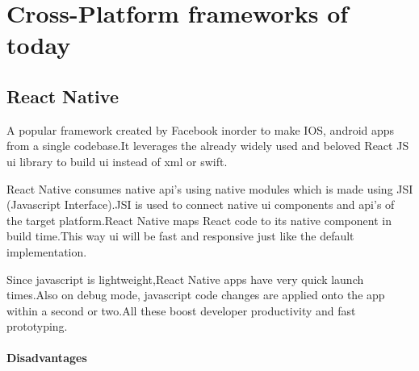 \documentclass[14pt]{extarticle}
\begin{document}
\newpage
\section{Cross-Platform frameworks of today}
\subsection{React Native}
\parbox{\linewidth}{
    \setlength{\parskip}{1em}

    A popular framework created by Facebook inorder to make IOS, android apps from a single codebase.It leverages the already widely used and beloved React JS ui library to build ui instead of xml or swift.

    React Native consumes native api's using native modules which is made using JSI (Javascript Interface).JSI is used to connect native ui components and api's of the target platform.React Native maps React code to its native component in build time.This way ui will be fast and responsive just like the default implementation.

    Since javascript is lightweight,React Native apps have very quick launch times.Also on debug mode, javascript code changes are applied onto the app
    within a second or two.All these boost developer productivity and fast prototyping.
}
\vfil
\paragraph{Disadvantages}
\end{document}
